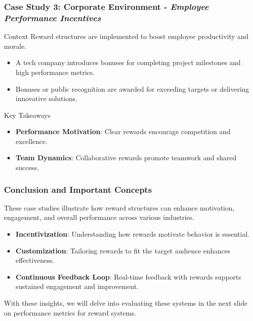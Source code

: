 \documentclass[aspectratio=169]{beamer}
\begin{document}
\begin{frame}[fragile]
    \frametitle{Case Study 3: Corporate Environment - \textit{Employee Performance Incentives}}
    \begin{block}{Context}
        Reward structures are implemented to boost employee productivity and morale.
    \end{block}

    \begin{itemize}
        \item A tech company introduces bonuses for completing project milestones and high performance metrics.
        \item Bonuses or public recognition are awarded for exceeding targets or delivering innovative solutions.
    \end{itemize}

    \begin{block}{Key Takeaways}
        \begin{itemize}
            \item \textbf{Performance Motivation}: Clear rewards encourage competition and excellence.
            \item \textbf{Team Dynamics}: Collaborative rewards promote teamwork and shared success.
        \end{itemize}
    \end{block}
\end{frame}

\begin{frame}[fragile]
    \frametitle{Conclusion and Important Concepts}
    These case studies illustrate how reward structures can enhance motivation, engagement, and overall performance across various industries.
    
    \begin{itemize}
        \item \textbf{Incentivization}: Understanding how rewards motivate behavior is essential.
        \item \textbf{Customization}: Tailoring rewards to fit the target audience enhances effectiveness.
        \item \textbf{Continuous Feedback Loop}: Real-time feedback with rewards supports sustained engagement and improvement.
    \end{itemize}
    
    With these insights, we will delve into evaluating these systems in the next slide on performance metrics for reward systems.
\end{frame}
\end{document}
